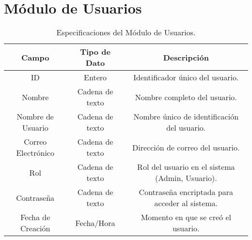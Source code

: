 
\section{Módulo de Usuarios}
\begin{table}[h!]
    \centering
    \begin{tabular}{|c|c|c|}
    \hline
    \rowcolor[HTML]{FCE8B2} 
    \textbf{Campo} & \textbf{Tipo de Dato} & \textbf{Descripción} \\ \hline
    ID & Entero & Identificador único del usuario. \\ \hline
    Nombre & Cadena de texto & Nombre completo del usuario. \\ \hline
    Nombre de Usuario & Cadena de texto & Nombre único de identificación del usuario. \\ \hline
    Correo Electrónico & Cadena de texto & Dirección de correo del usuario. \\ \hline
    Rol & Cadena de texto & Rol del usuario en el sistema (Admin, Usuario). \\ \hline
    Contraseña & Cadena de texto & Contraseña encriptada para acceder al sistema. \\ \hline
    Fecha de Creación & Fecha/Hora & Momento en que se creó el usuario. \\ \hline
    \end{tabular}
    \caption{Especificaciones del Módulo de Usuarios.}
\end{table}

